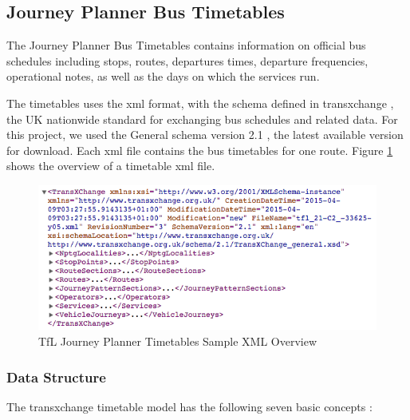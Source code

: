 \subsection{Journey Planner Bus Timetables}
The Journey Planner Bus Timetables \cite{open_data_feeds_description} contains information on official bus schedules including stops, routes, departures times, departure frequencies, operational notes, as well as the days on which the services run.

The timetables uses the \acrfull{xml} \cite{xml} format, with the schema defined in \gls{transxchange} \cite{transxchange}, the UK nationwide standard for exchanging bus schedules and related data. For this project, we used the General schema version 2.1 \cite{transxchange_downloads_and_schema} \cite{transxchange_schema_2.1_xsd}, the latest available version for download. Each \acrshort{xml} file contains the bus timetables for one route. Figure \ref{fig:xml_components} shows the overview of a timetable \acrshort{xml} file.

\begin{figure}
\centering
\includegraphics[width=1\textwidth]{figures/xml_components.png}
\caption{\label{fig:xml_components} TfL Journey Planner Timetables Sample XML Overview}
\end{figure}

\subsubsection{Data Structure}
The \gls{transxchange} timetable model has the following seven basic concepts \cite{transxchange_schema_guide}:

